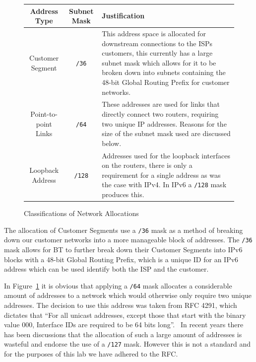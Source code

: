 \begin{figure}[!ht]     \caption{Classifications of Network Allocations}
\label{figure:network-alloc-3}     \centering
\begin{tabular}{|c|c|p{5.5cm}|}

        \hline \textbf{Address Type} & \textbf{Subnet Mask} &
		\textbf{Justification} \\

        \hline         Customer Segment & \texttt{/36} & This address space is
allocated for downstream connections to the ISPs customers, this currently has
a large subnet mask which allows for it to be broken down into subnets
containing the 48-bit Global Routing Prefix for customer networks.\\

        \hline         Point-to-point Links & \texttt{/64} & These addresses
are used for links that directly connect two routers, requiring two unique IP
addresses. Reasons for the size of the subnet mask used are discussed below.\\

        \hline         Loopback Address & \texttt{/128} & Addresses used for
the loopback interfaces on the routers, there is only a requirement for a
single address as was the case with IPv4. In IPv6 a \texttt{/128} mask produces
this.\\

		\hline     \end{tabular} \end{figure}

The allocation of Customer Segments use a \texttt{/36} mask as a method of
breaking down our customer networks into a more manageable block of addresses.
The \texttt{/36} mask allows for BT to further break down their Customer
Segments into IPv6 blocks with a 48-bit Global Routing Prefix, which is a
unique ID for an IPv6 address which can be used identify both the ISP and the
customer.

In Figure~\ref{figure:network-alloc-3} it is obvious that applying a
\texttt{/64} mask allocates a considerable amount of addresses to a network
which would otherwise only require two unique addresses. The decision to use
this address was taken from RFC 4291, which dictates that ``For all unicast
addresses, except those that start with the binary value 000, Interface IDs are
required to be 64 bits long''.~\cite{rfc4291} In recent years there has been discussions that
the allocation of such a large amount of addresses is wasteful and endorse the
use of a \texttt{/127} mask. However this is not a standard and for the
purposes of this lab we have adhered to the RFC.

